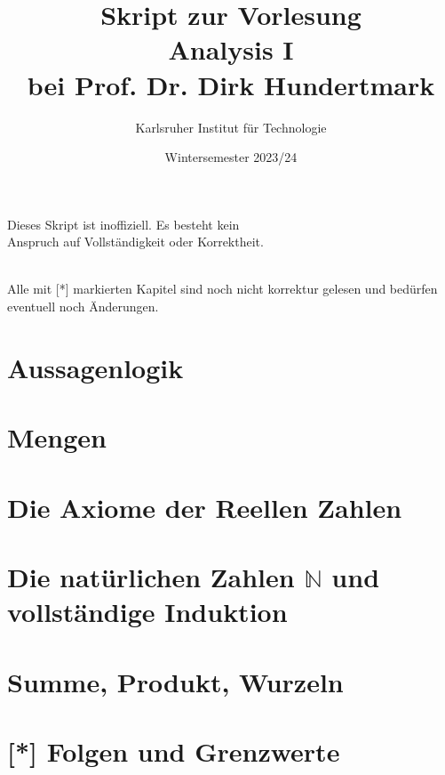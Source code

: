 \documentclass[11pt, twoside, a4paper]{article}
\theoremstyle{plain}
\newcommand{\naturalnumbers}{\mathbb{N}}
\begin{document}
    \title{\vspace{3cm} Skript zur Vorlesung\\Analysis I\\bei Prof. Dr. Dirk Hundertmark}
    \author{Karlsruher Institut für Technologie}
    \date{Wintersemester 2023/24}
    \maketitle
    \begin{center}
        Dieses Skript ist inoffiziell. Es besteht kein\\ Anspruch auf Vollständigkeit oder Korrektheit.
    \end{center}
    \thispagestyle{empty}
    \newpage

    \tableofcontents
    ~\\
    Alle mit [*] markierten Kapitel sind noch nicht korrektur gelesen und bedürfen eventuell noch Änderungen.
    \newpage


    \section{Aussagenlogik}
    


    \section{Mengen}
    


    \section{Die Axiome der Reellen Zahlen}
    


    \section{Die natürlichen Zahlen $\naturalnumbers$ und vollständige Induktion}
    


    \section{Summe, Produkt, Wurzeln}
    


    \section{[*] Folgen und Grenzwerte}
\end{document}
